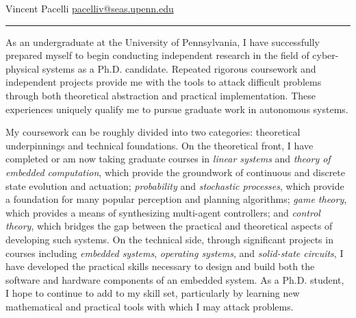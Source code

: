 \documentclass[]{letter}
\title{}
\author{}
\begin{document}
\newcommand{\comm}[1]{}

Vincent Pacelli \hfill \hfill \href{mailto:pacelliv@seas.upenn.edu}{pacelliv@seas.upenn.edu}\\
\rule{\textwidth}{0.1pt}

As an undergraduate at the University of Pennsylvania, I have successfully prepared myself to begin conducting independent research in the field of cyber-physical systems as a Ph.D. candidate. Repeated rigorous coursework and independent projects provide me with the tools to attack difficult problems through both theoretical abstraction and practical implementation. These experiences uniquely qualify me to pursue graduate work in autonomous systems.


My coursework can be roughly divided into two categories: theoretical underpinnings and technical foundations.  On the theoretical front, I have completed or am now taking graduate courses in \emph{linear systems} and \emph{theory of embedded computation}, which provide the groundwork of continuous and discrete state evolution and actuation; \emph{probability} and \emph{stochastic processes}, which provide a foundation for many popular perception and planning algorithms; \emph{game theory}, which provides a means of synthesizing multi-agent controllers; and \emph{control theory}, which bridges the gap between the practical and theoretical aspects of developing such systems.  On the technical side, through significant projects in courses including \emph{embedded systems}, \emph{operating systems}, and \emph{solid-state circuits}, I have developed the practical skills necessary to design and build both the software and hardware components of an embedded system.  As a Ph.D. student, I hope to continue to add to my skill set, particularly by learning new mathematical and practical tools with which I may attack problems.
\end{document}
